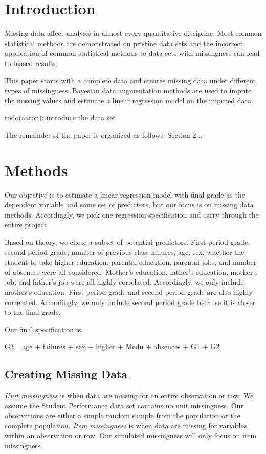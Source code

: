 \documentclass[11pt]{article}
\begin{document}
\section{Introduction}

Missing data affect analysis in almost every quantitative discipline. Most common statistical methods are demonstrated on pristine data sets and the incorrect application of common statistical methods to data sets with missingness can lead to biased results. 

This paper starts with a complete data and creates missing data under different types of missingness. Bayesian data augmentation methods are used to impute the missing values and estimate a linear regression model on the imputed data. 

todo(aaron): introduce the data set

The remainder of the paper is organized as follows: Section 2...

\section{Methods}

Our objective is to estimate a linear regression model with final grade as the dependent variable and some set of predictors, but our focus is on missing data methods. Accordingly, we pick one regression specification and carry through the entire project. 

Based on theory, we chose a subset of potential predictors. First period grade, second period grade, number of previous class failures, age, sex, whether the student to take higher education, parental education, parental jobs, and number of absences were all considered. Mother's education, father's education, mother's job, and father's job were all highly correlated. Accordingly, we only include mother's education. First period grade and second period grade are also highly correlated. Accordingly, we only include second period grade because it is closer to the final grade. 

Our final specification is 

G3 ~ age + failures + sex + higher + Medu + absences + G1 + G2

\subsection{Creating Missing Data}

\textit{Unit missingness} is when data are missing for an entire observation or row. We assume the Student Performance data set contains no unit missingness. Our observations are either a simple random sample from the population or the complete population. \textit{Item missingness} is when data are missing for variables within an observation or row. Our simulated missingness will only focus on item missingness.
\end{document}
